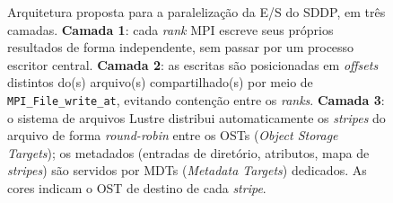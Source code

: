 \begin{figure}[H]
  \caption{Arquitetura proposta para a paralelização da E/S do SDDP, em três
  camadas. \textbf{Camada 1}: cada \textit{rank} MPI escreve seus próprios
  resultados de forma independente, sem passar por um processo escritor central.
  \textbf{Camada 2}: as escritas são posicionadas em \textit{offsets} distintos
  do(s) arquivo(s) compartilhado(s) por meio de \texttt{MPI\_File\_write\_at},
  evitando contenção entre os \textit{ranks}. \textbf{Camada 3}: o sistema de
  arquivos Lustre distribui automaticamente os \textit{stripes} do arquivo de
  forma \textit{round-robin} entre os OSTs (\textit{Object Storage Targets}); os
  metadados (entradas de diretório, atributos, mapa de \textit{stripes}) são
  servidos por MDTs (\textit{Metadata Targets}) dedicados. As cores indicam o
  OST de destino de cada \textit{stripe}.}
  \label{fig:proposta_3camadas}
\end{figure}
